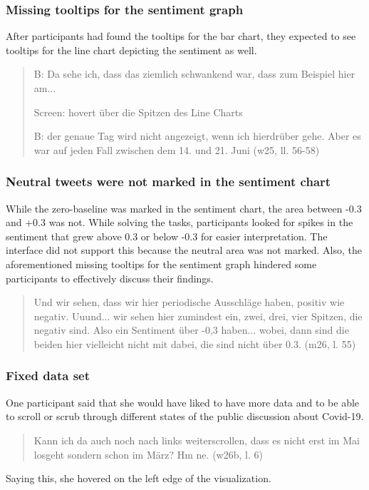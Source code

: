 \subsubsection*{Missing tooltips for the sentiment graph}
After participants had found the tooltips for the bar chart, they expected to see tooltips for the line chart depicting the sentiment as well.

\begin{quote}
    B: Da sehe ich, dass das ziemlich schwankend war, dass zum Beispiel hier am... 

    Screen: hovert über die Spitzen des Line Charts

    B: der genaue Tag wird nicht angezeigt, wenn ich hierdrüber gehe. Aber es war auf jeden Fall zwischen dem 14. und 21. Juni (w25, ll. 56-58)
\end{quote}

\subsubsection*{Neutral tweets were not marked in the sentiment chart}
While the zero-baseline was marked in the sentiment chart, the area between -0.3 and +0.3 was not. While solving the tasks, participants looked for spikes in the sentiment that grew above 0.3 or below -0.3 for easier interpretation. The interface did not support this because the neutral area was not marked. Also, the aforementioned missing tooltips for the sentiment graph hindered some participants to effectively discuss their findings.

\begin{quote}
    Und wir sehen, dass wir hier periodische Ausschläge haben, positiv wie negativ. Uuund... wir sehen hier zumindest ein, zwei, drei, vier Spitzen, die negativ sind. Also ein Sentiment über -0,3 haben... wobei, dann sind die beiden hier vielleicht nicht mit dabei, die sind nicht über 0.3. (m26, l. 55)
\end{quote}

\subsubsection*{Fixed data set}
One participant said that she would have liked to have more data and to be able to scroll or scrub through different states of the public discussion about Covid-19.

\begin{quote}
    Kann ich da auch noch nach links weiterscrollen, dass es nicht erst im Mai losgeht sondern schon im März? Hm ne. (w26b, l. 6)
\end{quote}

Saying this, she hovered on the left edge of the visualization. 
